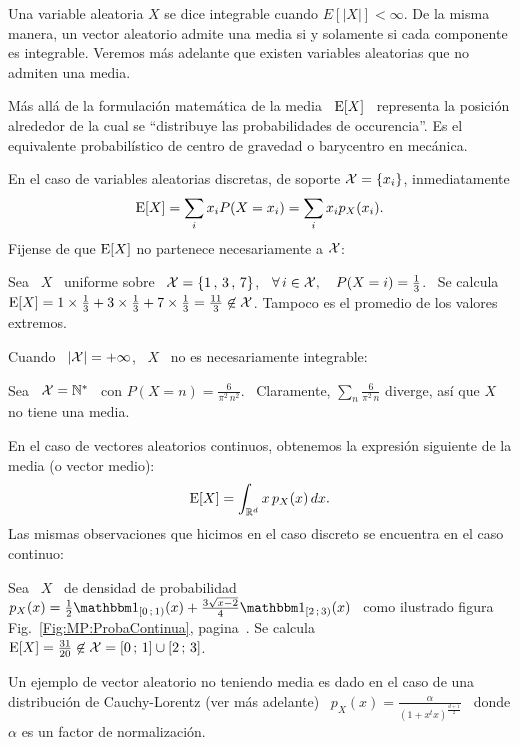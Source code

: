 Una variable  aleatoria $X$ se dice  integrable cuando $E[|X|] <  \infty$. De la
misma  manera, un  vector aleatorio  admite  una media  si y  solamente si  cada
componente  es   integrable.  Veremos  m\'as  adelante   que  existen  variables
aleatorias que no admiten una media.

M\'as  all\'a  de  la formulaci\'on  matem\'atica  de  la  media \  $\operatorname{E}[X]$  \
representa la posici\'on alrededor de la cual se ``distribuye las probabilidades
de  occurencia''. Es  el equivalente  probabil\'istico de  centro de  gravedad o
barycentro en mec\'anica.

En  el caso de  variables aleatorias  discretas, de  soporte $\mathcal{X}  = \{  x_i \}$,
inmediatamente
%
\[
\operatorname{E}[X] = \sum_i x_i P(X = x_i) = \sum_i x_i p_X(x_i).
\]
%
\noindent  Fijense de  que $\operatorname{E}[X]$  no partenece  necesariamente a  $\mathcal{X}$:
%
\begin{ejemplo}
  Sea \  $X$ \  uniforme sobre \  $\mathcal{X} = \{  1 \,  , \, 3  \, ,  \, 7 \}$,  \ie \
  $\forall \,  i \in \mathcal{X}, \quad  P(X = i) =  \frac13$. \ Se calcula  $\operatorname{E}[X] = 1
  \times \frac13  + 3 \times \frac13  + 7 \times \frac13  = \frac{11}{3} \not\in
  \mathcal{X}$.  Tampoco es el promedio de los valores extremos.
\end{ejemplo}
%
\noindent Cuando \ $|\mathcal{X}| = +\infty$, \ $X$ \ no es necesariamente integrable:
%
\begin{ejemplo}
  Sea \ $\mathcal{X} = \mathbb{N}^*$ \ con  $P(X = n) = \frac{6}{\pi^2 \, n^2}$. \ Claramente,
  $\sum_n\frac{6}{\pi^2 \, n}$ diverge, as\'i que $X$ no tiene una media.
\end{ejemplo}

En el caso de vectores  aleatorios continuos, obtenemos la expresi\'on siguiente
de la media (o vector medio):
%
\[
\operatorname{E}[X] = \int_{\mathbb{R}^d} x \, p_X(x) \, dx.
\]
%
\noindent Las mismas observaciones que  hicimos en el caso discreto se encuentra
en el caso continuo:
%
\begin{ejemplo}
  Sea \ $X$  \ de densidad de probabilidad  \ $p_X(x) = \frac12 \un_{[0  \, ; \,
    1)}(x) +  \frac{3 \sqrt{x-2}}{4}  \un_{[2 \, ;  \, 3)}(x)$ \  como ilustrado
  figura                                         Fig.~\ref{Fig:MP:ProbaContinua},
  pagina~\pageref{Fig:MP:ProbaContinua}. Se  calcula \ $\operatorname{E}[X]  = \frac{31}{20}
  \not\in \mathcal{X} = [0 \, ; \, 1] \cup [2 \, ; \, 3]$.
\end{ejemplo}
%
\begin{ejemplo}
  Un ejemplo  de vector aleatorio no  teniendo media es  dado en el caso  de una
  distribuci\'on de Cauchy-Lorentz (ver  m\'as adelante) \ $\displaystyle p_X(x)
  = \frac{\alpha}{\left( 1 + x^t x \right)^{\frac{d+1}{2}}}$ \ donde $\alpha$ es
  un factor de normalizaci\'on.
\end{ejemplo}

